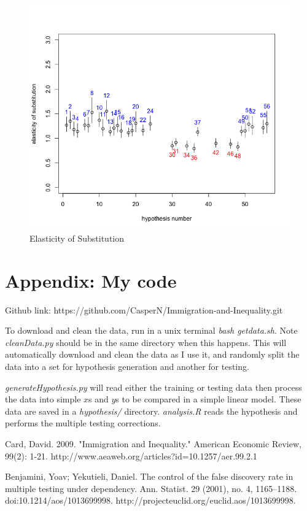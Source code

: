 \documentclass[11pt]{article}
\theoremstyle{definition}
\theoremstyle{remark}
\begin{document}
\begin{figure}[H]
    \centering
    \caption{Elasticity of Substitution}
    \includegraphics[width=.5\textwidth]{elasticityFinal.png}

    \label{est}
\end{figure}




\section{Appendix: My code}

Github link: https://github.com/CasperN/Immigration-and-Inequality.git

To download and clean the data, run in a unix terminal \textit{bash getdata.sh}.
Note \textit{cleanData.py} should be in the same directory when this happens.
This will automatically download and clean the data as I use it, and randomly
split the data into a set for hypothesis generation and another for testing.

\textit{generateHypothesis.py} will read either the training or testing data
then process the data into simple $x$s and $y$s to be compared in a simple
linear model. These data are saved in a \textit{hypothesis/} directory.
\textit{analysis.R} reads the hypothesis and performs the multiple testing
corrections.


\begin{thebibliography}
\small
     Card, David. 2009. "Immigration and Inequality." American Economic Review, 99(2): 1-21. http://www.aeaweb.org/articles?id=10.1257/aer.99.2.1

     Benjamini, Yoav; Yekutieli, Daniel. The control of the false discovery rate in multiple testing under dependency. Ann. Statist. 29 (2001), no. 4, 1165--1188. doi:10.1214/aos/1013699998. http://projecteuclid.org/euclid.aos/1013699998.
\end{thebibliography}
\end{document}
